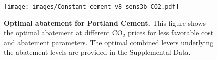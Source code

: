 \documentclass[12pt, a4paper]{article} %
\newcommand{\Suppl}{Supplemental}
\begin{document}
\begin{figure}[ht]
\centering
\texttt{[image: images/Constant cement\_v8\_sens3b\_CO2.pdf]}
\caption{\textbf{Optimal abatement for Portland Cement.} This figure shows the optimal abatement at different CO$_2$ prices for less favorable cost and abatement parameters. The optimal combined levers underlying the abatement levels are provided in the \Suppl$ $ Data.}
\label{fig: constant_worse_value}
\end{figure}
\end{document}
